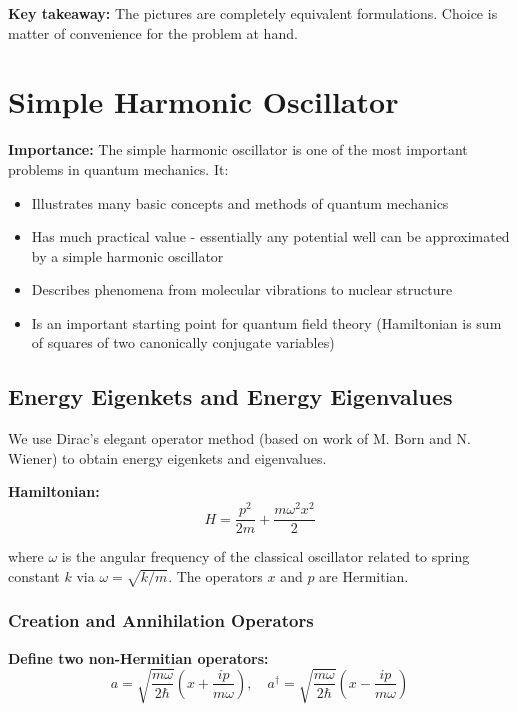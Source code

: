 \documentclass[11pt,a4paper]{article}
\begin{document}
\textbf{Key takeaway:} The pictures are completely equivalent formulations. Choice is matter of convenience for the problem at hand.

\newpage
\section{Simple Harmonic Oscillator}

\textbf{Importance:} The simple harmonic oscillator is one of the most important problems in quantum mechanics. It:
\begin{itemize}
\item Illustrates many basic concepts and methods of quantum mechanics
\item Has much practical value - essentially any potential well can be approximated by a simple harmonic oscillator
\item Describes phenomena from molecular vibrations to nuclear structure
\item Is an important starting point for quantum field theory (Hamiltonian is sum of squares of two canonically conjugate variables)
\end{itemize}

\subsection{Energy Eigenkets and Energy Eigenvalues}

We use Dirac's elegant operator method (based on work of M. Born and N. Wiener) to obtain energy eigenkets and eigenvalues.

\textbf{Hamiltonian:}
\begin{equation}
H = \frac{p^2}{2m} + \frac{m\omega^2x^2}{2}
\tag{2.122}
\end{equation}

where $\omega$ is the angular frequency of the classical oscillator related to spring constant $k$ via $\omega = \sqrt{k/m}$. The operators $x$ and $p$ are Hermitian.

\subsubsection{Creation and Annihilation Operators}

\textbf{Define two non-Hermitian operators:}
\begin{equation}
a = \sqrt{\frac{m\omega}{2\hbar}}\left(x + \frac{ip}{m\omega}\right), \quad a^\dagger = \sqrt{\frac{m\omega}{2\hbar}}\left(x - \frac{ip}{m\omega}\right)
\tag{2.123}
\end{equation}
\end{document}
